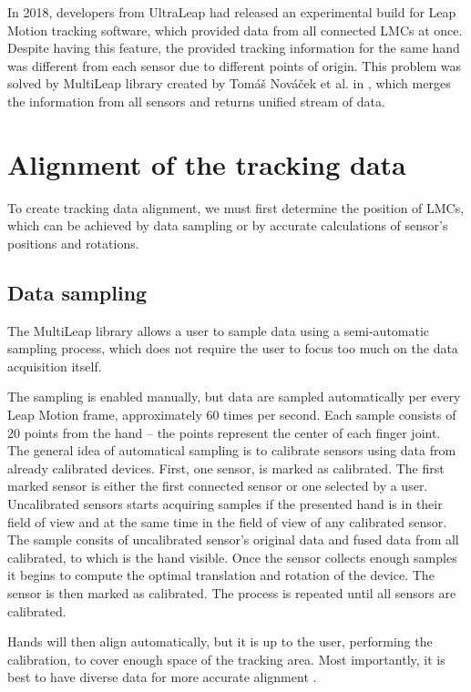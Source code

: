 
In 2018, developers from UltraLeap had released an experimental build for Leap Motion tracking software, which provided data from all connected LMCs at once. Despite having this feature, the provided tracking information for the same hand was different from each sensor due to different points of origin. This problem was solved by MultiLeap library created by Tomáš Nováček et al. in \cite{tomasMultileap}, which merges the information from all sensors and returns unified stream of data. 

\section{Alignment of the tracking data}

To create tracking data alignment, we must first determine the position of LMCs, which can be achieved by data sampling or by accurate calculations of sensor's positions and rotations.

\subsection{Data sampling}

The MultiLeap library allows a user to sample data using a semi-automatic sampling process, which does not require the user to focus too much on the data acquisition itself.

The sampling is enabled manually, but data are sampled automatically per every Leap Motion frame, approximately 60 times per second. Each sample consists of 20 points from the hand – the points represent the center of each finger joint. 
The general idea of automatical sampling is to calibrate sensors using data from already calibrated devices. First, one sensor, is marked as calibrated. The first marked sensor is either the first connected sensor or one selected by a user. Uncalibrated sensors starts acquiring samples if the presented hand is in their field of view and at the same time in the field of view of any calibrated sensor. The sample consits of uncalibrated sensor's original data and fused data from all calibrated, to which is the hand visible. Once the sensor collects enough samples it begins to compute the optimal translation and rotation of the device. The sensor is then marked as calibrated. The process is repeated until all sensors are calibrated.


Hands will then align automatically, but it is up to the user, performing the calibration, to cover enough space of the tracking area. Most importantly, it is best to have diverse data for more accurate alignment \cite{tomasMultileap}.

